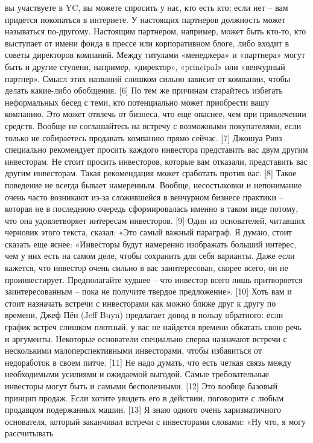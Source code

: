\documentclass[ebook,12pt,oneside,openany]{memoir}
\begin{document}
вы участвуете в YC, вы можете спросить у нас, кто есть кто; если нет –
вам придется покопаться в интернете. У настоящих партнеров должность
может называться по-другому. Настоящим партнером, например, может быть
кто-то, кто выступает от имени фонда в прессе или корпоративном блоге,
либо входит в советы директоров компаний. Между титулами «менеджера» и
«партнера» могут быть и другие ступени, например, «директор»,
«principal» или «венчурный партнер». Смысл этих названий слишком
сильно зависит от компании, чтобы делать какие-либо обобщения. [6] По
тем же причинам старайтесь избегать неформальных бесед с теми, кто
потенциально может приобрести вашу компанию. Это может отвлечь от
бизнеса, что еще опаснее, чем при привлечении средств. Вообще не
соглашайтесь на встречу с возможными покупателями, если только не
собираетесь продавать компанию прямо сейчас. [7] Джошуа Ривз
специально рекомендует просить каждого инвестора представить вас двум
другим инвесторам. Не стоит просить инвесторов, которые вам отказали,
представить вас другим инвесторам. Такая рекомендация может сработать
против вас. [8] Такое поведение не всегда бывает намеренным. Вообще,
несостыковки и непонимание очень часто возникают из-за сложившейся в
венчурном бизнесе практики – которая не в последнюю очередь
сформировалась именно в таком виде потому, что она удовлетворяет
интересам инвесторов. [9] Один из основателей, читавших черновик этого
текста, сказал: «Это самый важный параграф. Я думаю, стоит сказать еще
яснее: «Инвесторы будут намеренно изображать больший интерес, чем у
них есть на самом деле, чтобы сохранить для себя варианты. Даже если
кажется, что инвестор очень сильно в вас заинтересован, скорее всего,
он не проинвестирует. Предполагайте худшее – что инвестор всего лишь
притворяется заинтересованным – пока не получите твердое предложение».
[10] Хоть вам и стоит назначать встречи с инвесторами как можно ближе
друг к другу по времени, Джеф Пён (Jeff Buyn) предлагает довод в
пользу обратного: если график встреч слишком плотный, у вас не
найдется времени обкатать свою речь и аргументы. Некоторые основатели
специально сперва назначают встречи с несколькими малоперспективными
инвесторами, чтобы избавиться от недоработок в своем питче. [11] Не
надо думать, что есть четкая связь между необходимыми усилиями и
ожидаемой выгодой. Самые требовательные инвесторы могут быть и самыми
бесполезными. [12] Это вообще базовый принцип продаж. Если хотите
увидеть его в действии, поговорите с любым продавцом подержанных
машин. [13] Я знаю одного очень харизматичного основателя, который
заканчивал встречи с инвесторами словами: «Ну что, я могу рассчитывать
\end{document}
